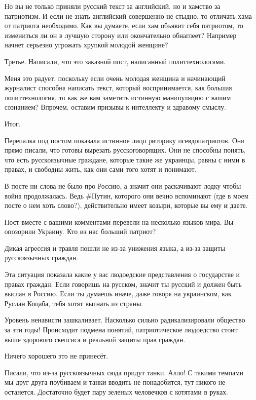 Но вы не только приняли русский текст за английский, но и хамство за
патриотизм. И если не знать английский совершенно не стыдно, то отличать хама
от патриота необходимо. Как вы думаете, если хам объявит себя патриотом, то
измениться ли он в лучшую сторону или окончательно обнаглеет? Например начнет
серьезно угрожать хрупкой молодой женщине?

Третье. Написали, что это заказной пост, написанный политтехнологами. 

Меня это радует, поскольку если очень молодая женщина и начинающий журналист
способна написать текст, который воспринимается, как большая политтехнология,
то как же вам заметить истинную манипуляцию с вашим сознанием? Впрочем, оставим
призывы к интеллекту и здравому смыслу.

Итог.

Перепалка под постом показала истинное лицо риторику псевдопатриотов. Они прямо
писали, что готовы вырезать русскоговорящих. Они не способны понять, что есть
русскоязычные граждане, которые такие же украинцы, равны с ними в правах, и
свободны жить, как они сами того хотят и понимают. 

В посте ни слова не было про Россию, а значит они раскачивают лодку чтобы война
продолжалась. Ведь \#Путин, которого они вечно вспоминают (где в моем посте о
нем хоть слово?), действительно имеет козыри, которые вы ему и даете. 

Пост вместе с вашими комментами перевели на несколько языков мира. Вы опозорили
Украину. Кто из нас больший патриот?

Дикая агрессия и травля пошли не из-за унижения языка, а из-за защиты
русскоязычных граждан. 

Эта ситуация показала какие у вас людоедские представления о государстве и
правах граждан. Если говоришь на русском, значит ты русский и должен быть
выслан в Россию. Если ты думаешь иначе, даже говоря на украинском, как Руслан
Коцаба, тебя хотят выгнать из страны. 

Уровень ненависти зашкаливает. Насколько сильно радикализировали общество за
эти годы! Происходит подмена понятий, патриотическое людоедство стоит выше
здорового скепсиса и реальной защиты прав граждан. 

Ничего хорошего это не принесёт. 

Писали, что из-за русскоязычных сюда придут танки. Алло! С такими темпами мы
друг друга поубиваем и танки вводить не понадобится, тут никого не останется.
Достаточно будет пару зеленых человечков с котятами в руках. 

